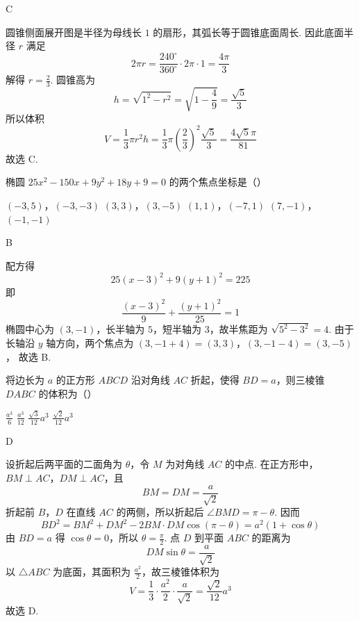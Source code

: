 \documentclass[UTF8,a4paper,oneside,11pt]{ctexbook}
\begin{document}
\begin{answer}
C
\end{answer}

\begin{solution}
圆锥侧面展开图是半径为母线长 \(1\) 的扇形，其弧长等于圆锥底面周长. 因此底面半径 \(r\) 满足
\[
2\pi r=\frac{240^{\circ}}{360^{\circ}}\cdot2\pi\cdot1=\frac{4\pi}{3}
\]
解得 \(r=\frac{2}{3}\). 圆锥高为
\[
h=\sqrt{1^2-r^2}=\sqrt{1-\frac{4}{9}}=\frac{\sqrt{5}}{3}
\]
所以体积
\[
V=\frac{1}{3}\pi r^2h=\frac{1}{3}\pi\left(\frac{2}{3}\right)^2\frac{\sqrt{5}}{3}=\frac{4\sqrt{5}\pi}{81}
\]
故选 C.
\end{solution}

\begin{problem}
椭圆 \(25x^{2} - 150x + 9y^{2} + 18y + 9 = 0\) 的两个焦点坐标是（\quad）

\choices
    {\(\left(-3, 5\right)\)，\(\left(-3, -3\right)\)}
    {\(\left(3, 3\right)\)，\(\left(3, -5\right)\)}
    {\(\left(1, 1\right)\)，\(\left(-7, 1\right)\)}
    {\(\left(7, -1\right)\)，\(\left(-1, -1\right)\)}
\end{problem}

\begin{answer}
B
\end{answer}

\begin{solution}
配方得
\[
25(x-3)^2+9(y+1)^2=225
\]
即
\[
\frac{(x-3)^2}{9}+\frac{(y+1)^2}{25}=1
\]
椭圆中心为 \((3,-1)\)，长半轴为 \(5\)，短半轴为 \(3\)，故半焦距为 \(\sqrt{5^2-3^2}=4\). 由于长轴沿 \(y\) 轴方向，两个焦点为
\((3,-1+4)=(3,3)\)，\((3,-1-4)=(3,-5)\)，
故选 B.
\end{solution}

\begin{problem}
将边长为 \(a\) 的正方形 \(ABCD\) 沿对角线 \(AC\) 折起，使得 \(BD = a\)，则三棱锥 \(DABC\) 的体积为（\quad）

\choices
    {\(\frac{a^3}{6}\)}
    {\(\frac{a^3}{12}\)}
    {\(\frac{\sqrt{3}}{12} a^3\)}
    {\(\frac{\sqrt{2}}{12} a^3\)}
\end{problem}

\begin{answer}
D
\end{answer}

\begin{solution}
设折起后两平面的二面角为 \(\theta\)，令 \(M\) 为对角线 \(AC\) 的中点. 在正方形中，\(BM\perp AC\)，\(DM\perp AC\)，且
\[
BM=DM=\frac{a}{\sqrt{2}}
\]
折起前 \(B\)，\(D\) 在直线 \(AC\) 的两侧，所以折起后 \(\angle BMD=\pi-\theta\). 因而
\[
BD^2=BM^2+DM^2-2BM\cdot DM\cos(\pi-\theta)=a^2(1+\cos\theta)
\]
由 \(BD=a\) 得 \(\cos\theta=0\)，所以 \(\theta=\frac{\pi}{2}\). 点 \(D\) 到平面 \(ABC\) 的距离为
\[
DM\sin\theta=\frac{a}{\sqrt{2}}
\]
以 \(\triangle ABC\) 为底面，其面积为 \(\frac{a^2}{2}\)，故三棱锥体积为
\[
V=\frac{1}{3}\cdot\frac{a^2}{2}\cdot\frac{a}{\sqrt{2}}=\frac{\sqrt{2}}{12}a^3
\]
故选 D.
\end{solution}
\end{document}
